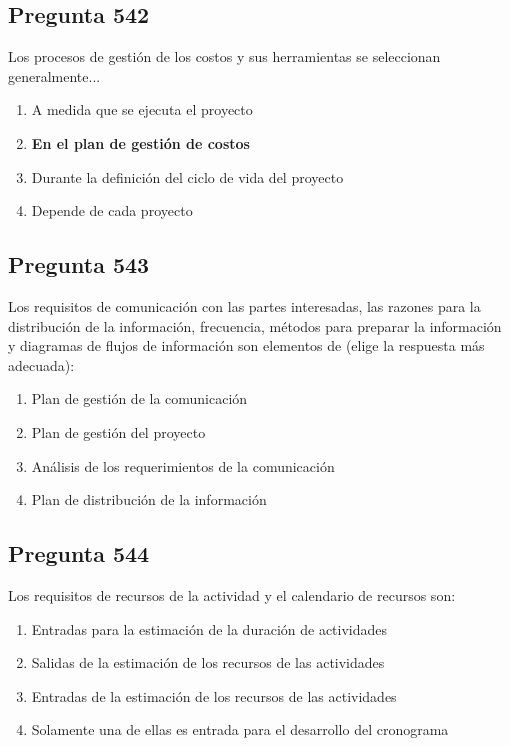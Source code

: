 \documentclass[11pt,a4paper]{article}
\begin{document}
\subsection*{Pregunta 542}
Los procesos de gestión de los costos y sus herramientas se seleccionan generalmente...

\begin{enumerate}[label=\alph*)]
  \item A medida que se ejecuta el proyecto
  \item \textbf{En el plan de gestión de costos}
  \item Durante la definición del ciclo de vida del proyecto
  \item Depende de cada proyecto
\end{enumerate}

\subsection*{Pregunta 543}
Los requisitos de comunicación con las partes interesadas, las razones para la distribución de la información, frecuencia, métodos para preparar la información y diagramas de flujos de información son elementos de (elige la respuesta más adecuada):

\begin{enumerate}[label=\alph*)]
  \item Plan de gestión de la comunicación
  \item Plan de gestión del proyecto
  \item Análisis de los requerimientos de la comunicación
  \item Plan de distribución de la información
\end{enumerate}

\subsection*{Pregunta 544}
Los requisitos de recursos de la actividad y el calendario de recursos son:

\begin{enumerate}[label=\alph*)]
  \item Entradas para la estimación de la duración de actividades
  \item Salidas de la estimación de los recursos de las actividades
  \item Entradas de la estimación de los recursos de las actividades
  \item Solamente una de ellas es entrada para el desarrollo del cronograma
\end{enumerate}
\end{document}

